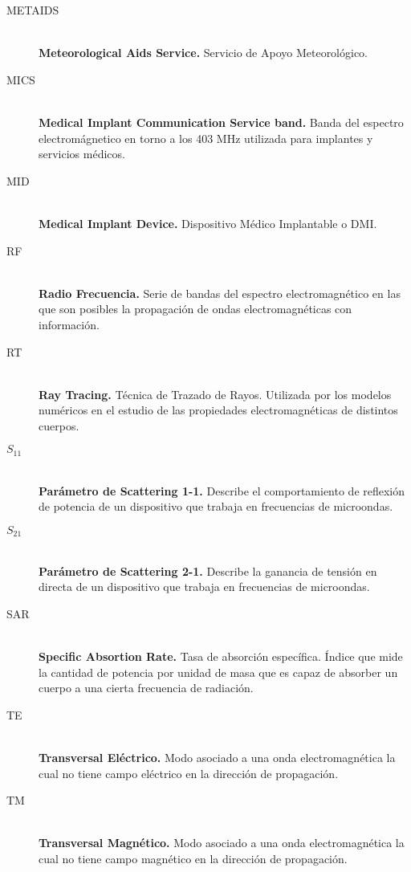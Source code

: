 \begin{description}
    \item[METAIDS]\mbox{}\\
    \textbf{Meteorological Aids Service.} Servicio de Apoyo Meteorológico.

    \item[MICS]\mbox{}\\
    \textbf{Medical Implant Communication Service band.} Banda del espectro electromágnetico en torno a los 403 MHz utilizada para implantes y servicios médicos.

    \item[MID]\mbox{}\\
    \textbf{Medical Implant Device.} Dispositivo Médico Implantable o DMI.

    \item[RF]\mbox{}\\
    \textbf{Radio Frecuencia.} Serie de bandas del espectro electromagnético en las que son posibles la propagación de ondas electromagnéticas con información.

    \item[RT]\mbox{}\\
    \textbf{Ray Tracing.} Técnica de Trazado de Rayos. Utilizada por los modelos numéricos en el estudio de las propiedades electromagnéticas de distintos cuerpos.

    \item[$S_{11}$]\mbox{}\\
    \textbf{Parámetro de Scattering 1-1.} Describe el comportamiento de reflexión de potencia de un dispositivo que trabaja en frecuencias de microondas.

    \item[$S_{21}$]\mbox{}\\
    \textbf{Parámetro de Scattering 2-1.} Describe la ganancia de tensión en directa de un dispositivo que trabaja en frecuencias de microondas.

    \item[SAR]\mbox{}\\
    \textbf{Specific Absortion Rate.} Tasa de absorción específica. Índice que mide la cantidad de potencia por unidad de masa que es capaz de absorber un cuerpo a una cierta frecuencia de radiación.

    \item[TE]\mbox{}\\
    \textbf{Transversal Eléctrico.} Modo asociado a una onda electromagnética la cual no tiene campo eléctrico en la dirección de propagación.

    \item[TM]\mbox{}\\
    \textbf{Transversal Magnético.} Modo asociado a una onda electromagnética la cual no tiene campo magnético en la dirección de propagación.


\end{description}
